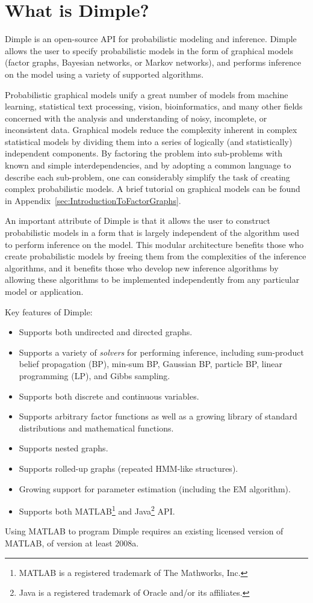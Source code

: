 \section{What is Dimple?}

Dimple is an open-source API for probabilistic modeling and inference. Dimple allows the user to specify probabilistic models in the form of graphical models (factor graphs, Bayesian networks, or Markov networks), and performs inference on the model using a variety of supported algorithms.

Probabilistic graphical models unify a great number of models from machine learning, statistical text processing, vision, bioinformatics, and many other fields concerned with the analysis and understanding of noisy, incomplete, or inconsistent data. Graphical models reduce the complexity inherent in complex statistical models by dividing them into a series of logically (and statistically) independent components. By factoring the problem into sub-problems with known and simple interdependencies, and by adopting a common language to describe each sub-problem, one can considerably simplify the task of creating complex probabilistic models.  A brief tutorial on graphical models can be found in Appendix~\ref{sec:IntroductionToFactorGraphs}.

An important attribute of Dimple is that it allows the user to construct probabilistic models in a form that is largely independent of the algorithm used to perform inference on the model. This modular architecture benefits those who create probabilistic models by freeing them from the complexities of the inference algorithms, and it benefits those who develop new inference algorithms by allowing these algorithms to be implemented independently from any particular model or application.

Key features of Dimple:
\begin{itemize}
\item Supports both undirected and directed graphs.
\item Supports a variety of \emph{solvers} for performing inference, including sum-product belief propagation (BP), min-sum BP, Gaussian BP, particle BP, linear programming (LP), and Gibbs sampling.
\item Supports both discrete and continuous variables.
\item Supports arbitrary factor functions as well as a growing library of standard distributions and mathematical functions.
\item Supports nested graphs.
\item Supports rolled-up graphs (repeated HMM-like structures).
\item Growing support for parameter estimation (including the EM algorithm).
\item Supports both MATLAB\footnote{MATLAB is a registered trademark of The Mathworks, Inc.} and Java\footnote{Java is a registered trademark of Oracle and/or its affiliates.} API.
\end{itemize}

\ifmatlab
Using MATLAB to program Dimple requires an existing licensed version of MATLAB, of version at least 2008a.
\fi
